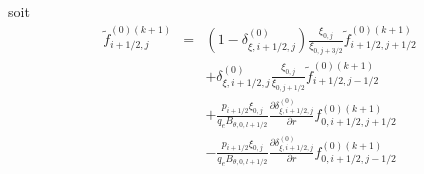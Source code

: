  soit \begin{eqnarray*}
\widetilde{f}_{i+1/2,j}^{\left(0\right)(k+1)} & = & \left(1-\delta_{\xi,i+1/2,j}^{(0)}\right)\frac{\xi_{0,j}}{\xi_{0,j+3/2}}\widetilde{f}_{i+1/2,j+1/2}^{\left(0\right)(k+1)}\\
 &  & +\delta_{\xi,i+1/2,j}^{(0)}\frac{\xi_{0,j}}{\xi_{0,j+1/2}}\widetilde{f}_{i+1/2,j-1/2}^{\left(0\right)(k+1)}\\
 &  & +\frac{p_{i+1/2}\xi_{0,j}}{q_{e}B_{\theta,0,l+1/2}}\frac{\partial\delta_{\xi,i+1/2,j}^{(0)}}{\partial r}f_{0,i+1/2,j+1/2}^{\left(0\right)(k+1)}\\
 &  & -\frac{p_{i+1/2}\xi_{0,j}}{q_{e}B_{\theta,0,l+1/2}}\frac{\partial\delta_{\xi,i+1/2,j}^{(0)}}{\partial r}f_{0,i+1/2,j-1/2}^{\left(0\right)(k+1)}\end{eqnarray*}


